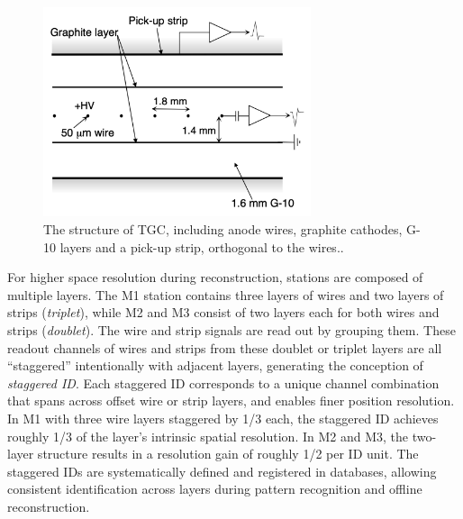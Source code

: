 \begin{figure}[htbp]
  \centering
  \includegraphics[width=0.7\textwidth]{figs/chapter2/TGC_cross_section.png}
  \caption{The structure of TGC, including anode wires, graphite cathodes, G-10 layers and a pick-up strip, orthogonal to the wires.\cite{ATLASDetector2008}.}
  \label{fig:TGC_cross_section}
\end{figure}

For higher space resolution during reconstruction, stations are composed of multiple layers. The M1 station contains three layers of wires and two layers of strips (\textit{triplet}), while M2 and M3 consist of two layers each for both wires and strips (\textit{doublet}). The wire and strip signals are read out by grouping them. These readout channels of wires and strips from these doublet or triplet layers are all ``staggered'' intentionally with adjacent layers, generating the conception of \textit{staggered ID}. Each staggered ID corresponds to a unique channel combination that spans across offset wire or strip layers, and enables finer position resolution. In M1 with three wire layers staggered by 1/3 each, the staggered ID achieves roughly 1/3 of the layer's intrinsic spatial resolution. In M2 and M3, the two-layer structure results in a resolution gain of roughly 1/2 per ID unit. The staggered IDs are systematically defined and registered in databases, allowing consistent identification across layers during pattern recognition and offline reconstruction. 

